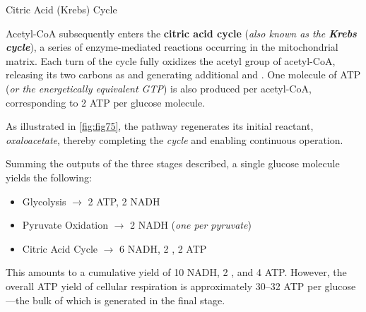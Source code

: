 \documentclass[10pt]{article}
\begin{document}
    \begin{core}[label=core:citric]{Citric Acid (Krebs) Cycle}

      Acetyl-CoA subsequently enters the \textbf{citric acid cycle} (\textit{also known as the \textbf{Krebs cycle}}), a series of enzyme-mediated reactions occurring in the mitochondrial matrix. Each turn of the cycle fully oxidizes the acetyl group of acetyl-CoA, releasing its two carbons as  and generating additional  and . One molecule of ATP (\textit{or the energetically equivalent GTP}) is also produced per acetyl-CoA, corresponding to 2 ATP per glucose molecule.


      As illustrated in \autoref{fig:fig75}, the pathway regenerates its initial reactant, \textit{oxaloacetate}, thereby completing the \textit{cycle} and enabling continuous operation.

    \end{core}

    Summing the outputs of the three stages described, a single glucose molecule yields the following:

    \begin{itemize}

      \item Glycolysis $\rightarrow$ 2 ATP, 2 NADH

      \item Pyruvate Oxidation $\rightarrow$ 2 NADH (\textit{one per pyruvate})

      \item Citric Acid Cycle $\rightarrow$ 6 NADH, 2 , 2 ATP

    \end{itemize}

    This amounts to a cumulative yield of 10 NADH, 2 , and 4 ATP. However, the overall ATP yield of cellular respiration is approximately 30--32 ATP per glucose---the bulk of which is generated in the final stage.
\end{document}
